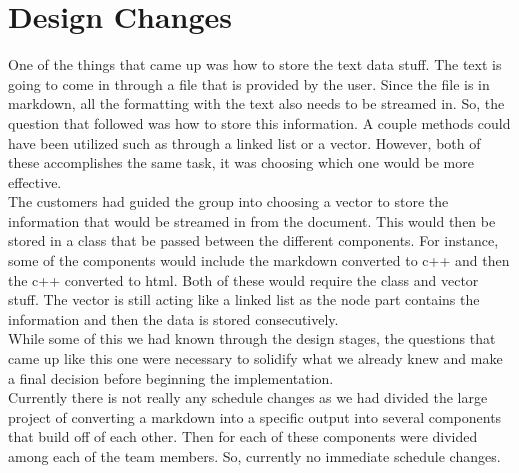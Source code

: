 \section{Design Changes}
One of the things that came up was how to store the text data stuff. The text is going to come in through a file that is provided by the user. Since the file is in markdown, all the formatting with the text also needs to be streamed in. So, the question that followed was how to store this information. A couple methods could have been utilized such as through a linked list or a vector. However, both of these accomplishes the same task, it was choosing which one would be more effective.\\

The customers had guided the group into choosing a vector to store the information that would be streamed in from the document. This would then be stored in a class that be passed between the different components. For instance, some of the components would include the markdown converted to c++ and then the c++ converted to html. Both of these would require the class and vector stuff. The vector is still acting like a linked list as the node part contains the information and then the data is stored consecutively.\\

While some of this we had known through the design stages, the questions that came up like this one were necessary to solidify what we already knew and make a final decision before beginning the implementation.\\

Currently there is not really any schedule changes as we had divided the large project of converting a markdown into a specific output into several components that build off of each other. Then for each of these components were divided among each of the team members. So, currently no immediate schedule changes. \\
